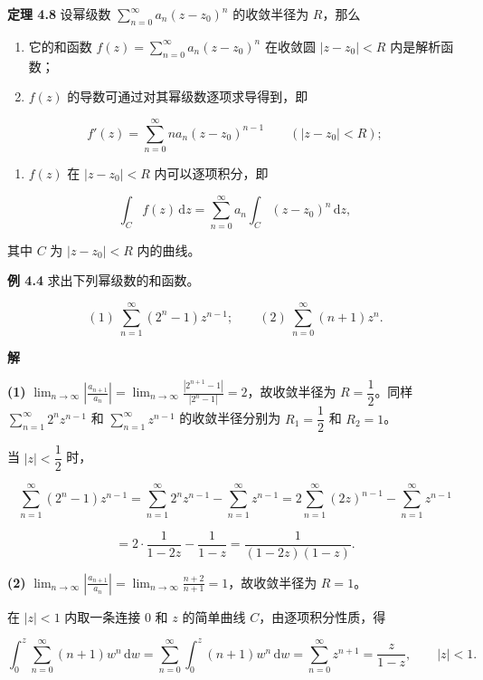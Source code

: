 \textbf{定理 4.8} 设幂级数
\(\displaystyle\sum_{n=0}^{\infty}a_n(z-z_0)^n\) 的收敛半径为
\(R\)，那么

\begin{enumerate}
\def\labelenumi{\arabic{enumi}.}
\tightlist
\item
  它的和函数 \(\displaystyle f(z)=\sum_{n=0}^{\infty}a_n(z-z_0)^n\)
  在收敛圆 \(|z-z_0|<R\) 内是解析函数；
\item
  \(f(z)\) 的导数可通过对其幂级数逐项求导得到，即
\end{enumerate}

\[
f'(z)=\sum_{n=0}^{\infty}n a_n(z-z_0)^{n-1}\qquad (|z-z_0|<R);
\]

\begin{enumerate}
\def\labelenumi{\arabic{enumi}.}
\setcounter{enumi}{2}
\tightlist
\item
  \(f(z)\) 在 \(|z-z_0|<R\) 内可以逐项积分，即
\end{enumerate}

\[
\int_C f(z)\,\mathrm{d}z=\sum_{n=0}^{\infty}a_n\int_C(z-z_0)^n\,\mathrm{d}z,
\]

其中 \(C\) 为 \(|z-z_0|<R\) 内的曲线。

\textbf{例 4.4} 求出下列幂级数的和函数。

\[
(1)\ \sum_{n=1}^{\infty}(2^n-1)z^{n-1};\qquad
(2)\ \sum_{n=0}^{\infty}(n+1)z^n .
\]

\textbf{解}

\textbf{(1)}
\(\displaystyle\lim_{n\to\infty}\left|\frac{a_{n+1}}{a_n}\right|=\lim_{n\to\infty}\frac{|2^{n+1}-1|}{|2^n-1|}=2\)，故收敛半径为
\(R=\dfrac{1}{2}\)。同样 \(\sum_{n=1}^{\infty}2^n z^{n-1}\) 和
\(\sum_{n=1}^{\infty}z^{n-1}\) 的收敛半径分别为 \(R_1=\dfrac{1}{2}\) 和
\(R_2=1\)。

当 \(|z|<\dfrac{1}{2}\) 时，

\[
\sum_{n=1}^{\infty}(2^n-1)z^{n-1}=\sum_{n=1}^{\infty}2^n z^{n-1}-\sum_{n=1}^{\infty}z^{n-1}
=2\sum_{n=1}^{\infty}(2z)^{n-1}-\sum_{n=1}^{\infty}z^{n-1}
\]

\[
=2\cdot\frac{1}{1-2z}-\frac{1}{1-z}=\frac{1}{(1-2z)(1-z)} .
\]

\textbf{(2)}
\(\displaystyle\lim_{n\to\infty}\left|\frac{a_{n+1}}{a_n}\right|=\lim_{n\to\infty}\frac{n+2}{n+1}=1\)，故收敛半径为
\(R=1\)。

在 \(|z|<1\) 内取一条连接 \(0\) 和 \(z\) 的简单曲线
\(C\)，由逐项积分性质，得

\[
\int_0^z\sum_{n=0}^{\infty}(n+1)w^n\,\mathrm{d}w=\sum_{n=0}^{\infty}\int_0^z(n+1)w^n\,\mathrm{d}w=\sum_{n=0}^{\infty}z^{n+1}=\frac{z}{1-z},\qquad |z|<1 .
\]

